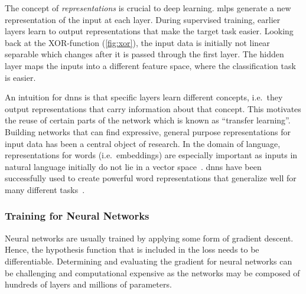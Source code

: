 The concept of \textit{representations} is crucial to deep learning.
\glspl{mlp} generate a new representation of the input at each layer.
During supervised training, earlier layers learn to output representations that make the target task easier.
Looking back at the XOR-function (\autoref{fig:xor}), the input data is initially not linear separable which changes after it is passed through the first layer.
The hidden layer maps the inputs into a different feature space, where the classification task is easier.

An intuition for \glspl{dnn} is that specific layers learn different concepts, i.e.\ they output representations that carry information about that concept.
This motivates the reuse of certain parts of the network which is known as \enquote{transfer learning}.
Building networks that can find expressive, general purpose representations for input data has been a central object of research.
In the domain of language, representations for words (i.e.\ embeddings) are especially important as inputs in natural language initially do not lie in a vector space~\autocite{Goodfellow-et-al-2016}.
\glspl{dnn} have been successfully used to create powerful word representations that generalize well for many different tasks~\autocite{zhao2023survey}.





\subsubsection{Training for Neural Networks}
Neural networks are usually trained by applying some form of gradient descent.
Hence, the hypothesis function that is included in the loss needs to be differentiable.
Determining and evaluating the gradient for neural networks can be challenging and computational expensive as the networks may be composed of hundreds of layers and millions of parameters.

